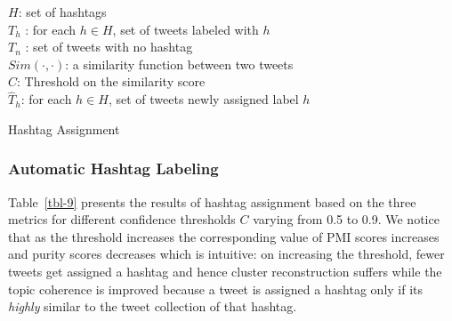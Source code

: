 \documentclass[10pt,a5paper,twoside]{article}
\begin{document}
\incmargin{1.5em}
\linesnumbered
\begin{algorithm}[hb!]
\dontprintsemicolon

\Input
{
$H$: set of hashtags\\
$T_h$ : for each $h \in H$, set of tweets labeled with $h$\\
$T_n$ : set of tweets with no hashtag \\
$\mathit{Sim}(\cdot,\cdot)$: a similarity function between two tweets\\
$C$: Threshold on the similarity score\\
}
\Output
{
$\hat{T}_h$: for each $h \in H$, set of tweets newly assigned label $h$\\
}
\BlankLine
{}
\caption{{\sc Hashtag Assignment} \label{alg-1}}
\end{algorithm}
\decmargin{1.5em}


\subsubsection{Automatic Hashtag Labeling}

Table~\ref{tbl-9} presents the results of hashtag assignment based on
the three metrics for different confidence thresholds $C$ varying from
0.5 to 0.9. We notice that as the threshold increases the
corresponding value of PMI scores increases and purity scores
decreases which is intuitive: on increasing the threshold, fewer 
tweets get assigned a hashtag and hence cluster
reconstruction suffers while the topic coherence is improved because a
tweet is assigned a hashtag only if its \emph{highly} similar to the tweet
collection of that hashtag.
\end{document}
